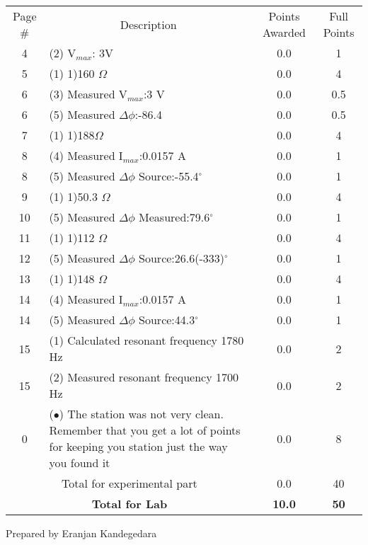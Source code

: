\documentclass{article}
\begin{document}
\begin{table}[h!] \centering \label{my-label} \begin{tabular}{|c|p{11.75 cm}|c|c|}\hline
\multirow{2}{1cm}{Page \#}& \multicolumn{1}{|c|}{\multirow{2}{*}{Description}}  & \multirow{2}{1.5 cm}{Points Awarded} & \multirow{2}{1 cm}{Full Points} \\   &  &  &\\\hline
4&(2) V$_{max}$: 3V&0.0&1\\\hline
5&(1) 1)160 $\Omega$&0.0&4\\\hline
6&(3) Measured V$_{max}$:3 V&0.0&0.5\\\hline
6&(5) Measured $\Delta\phi$:-86.4&0.0&0.5\\\hline
7&(1) 1)188$\Omega$&0.0&4\\\hline
8&(4) Measured I$_{max}$:0.0157 A&0.0&1\\\hline
8&(5) Measured $\Delta\phi$ Source:-55.4$^{\circ}$&0.0&1\\\hline
9&(1) 1)50.3 $\Omega$&0.0&4\\\hline
10&(5) Measured $\Delta\phi$ Measured:79.6$^{\circ}$&0.0&1\\\hline
11&(1) 1)112 $\Omega$&0.0&4\\\hline
12&(5) Measured $\Delta\phi$ Source:26.6(-333)$^{\circ}$&0.0&1\\\hline
13&(1) 1)148 $\Omega$&0.0&4\\\hline
14&(4) Measured I$_{max}$:0.0157 A&0.0&1\\\hline
14&(5) Measured $\Delta\phi$ Source:44.3$^{\circ}$&0.0&1\\\hline
15&(1) Calculated resonant frequency 1780 Hz&0.0&2\\\hline
15&(2) Measured resonant frequency 1700 Hz&0.0&2\\\hline
0&($\bullet$) The station was not very clean. Remember that you get a lot of points for keeping you station just the way you found it&0.0&8\\\hline
\multicolumn{2}{|c|}{\multirow{1}{*}{Total for experimental part}} &0.0& 40 \\\hline\multicolumn{2}{|c|}{\multirow{2}{*}{\textbf{Total for Lab}}} &\multirow{2}{*}{\textbf{10.0}}& \multirow{2}{*}{\textbf{50}} \\ \multicolumn{2}{|c|}{}&&\\ \hline\hline\end{tabular}
 \end{table}
\clearpage
\null\vfill \begin{center}Prepared by Eranjan Kandegedara\end{center}  \clearpage



\clearpage
\end{document}
